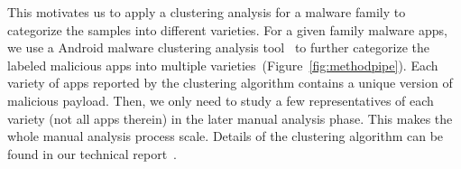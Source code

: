 This motivates us to apply a clustering analysis for a malware family to categorize
the samples into different varieties.
For a given family malware apps, we use a Android malware clustering analysis tool~\cite{li17:clustering}
to further categorize the labeled malicious apps into multiple varieties~(Figure~\ref{fig:methodpipe}).
Each variety of apps reported by the clustering algorithm contains a unique version of 
malicious payload.
Then, we only need to study a few representatives of each variety (not all apps therein)
in the later manual analysis phase. This makes the whole manual analysis process scale. Details of the
clustering algorithm can be found in our technical report~\cite{li17:clustering}.



